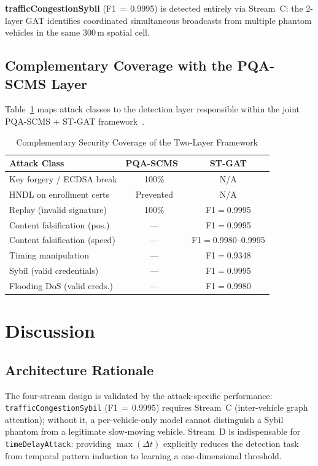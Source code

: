 \documentclass[conference]{IEEEtran}
\begin{document}
\textbf{trafficCongestionSybil} (F1\,$=$\,0.9995) is detected entirely via
Stream~C: the 2-layer GAT identifies coordinated simultaneous broadcasts
from multiple phantom vehicles in the same 300\,m spatial cell.

\subsection{Complementary Coverage with the PQA-SCMS Layer}

Table~\ref{tab:coverage} maps attack classes to the detection layer
responsible within the joint PQA-SCMS + ST-GAT framework~\cite{pqascms2025}.

\begin{table}[t]
\centering
\caption{Complementary Security Coverage of the Two-Layer Framework}
\label{tab:coverage}
\setlength{\tabcolsep}{3pt}
\begin{tabular}{lcc}
\toprule
\textbf{Attack Class} & \textbf{PQA-SCMS~\cite{pqascms2025}} & \textbf{ST-GAT} \\
\midrule
Key forgery / ECDSA break      & 100\%  & N/A \\
HNDL on enrollment certs       & Prevented & N/A \\
Replay (invalid signature)     & 100\%  & F1$=$0.9995 \\
Content falsification (pos.)   & ---    & F1$=$0.9995 \\
Content falsification (speed)  & ---    & F1$=$0.9980--0.9995 \\
Timing manipulation            & ---    & F1$=$0.9348 \\
Sybil (valid credentials)      & ---    & F1$=$0.9995 \\
Flooding DoS (valid creds.)    & ---    & F1$=$0.9980 \\
\bottomrule
\end{tabular}
\end{table}

\section{Discussion}
\label{sec:discussion}

\subsection{Architecture Rationale}

The four-stream design is validated by the attack-specific performance:
\texttt{trafficCongestionSybil} (F1\,$=$\,0.9995) requires Stream~C
(inter-vehicle graph attention); without it, a per-vehicle-only model
cannot distinguish a Sybil phantom from a legitimate slow-moving vehicle.
Stream~D is indispensable for \texttt{timeDelayAttack}: providing
$\max(\Delta t)$ explicitly reduces the detection task from temporal
pattern induction to learning a one-dimensional threshold.
\end{document}
